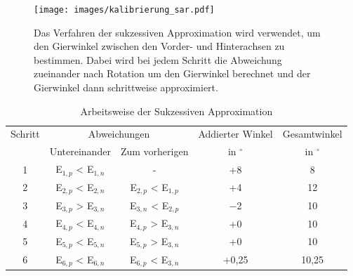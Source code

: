 	\begin{figure}[h]
		\centering
		\texttt{[image: images/kalibrierung\_sar.pdf]}
		\caption[Sukzessive Approximation]{Das Verfahren der sukzessiven Approximation wird verwendet, um den Gierwinkel zwischen den Vorder- und Hinterachsen zu bestimmen. Dabei wird bei jedem Schritt die Abweichung zueinander nach Rotation um den Gierwinkel berechnet und der Gierwinkel dann schrittweise approximiert.}
		\label{img:sar}
	\end{figure}


	\begin{table}[h!]
		\centering
		\caption{Arbeitsweise der Sukzessiven Approximation}
		\label{tab:sar}
		\begin{tabular}{ccccc}
			\toprule
			Schritt & \multicolumn{2}{c}{Abweichungen} & Addierter Winkel & Gesamtwinkel\\
			& Untereinander & Zum vorherigen & in $^\circ$& in $^\circ$\\
			\midrule
			1 & E$_{1,p}$ < E$_{1,n}$ 	& -	& +8  & 8 \\
			2 & E$_{2,p}$ < E$_{2,n}$ 	& E$_{2,p}$ < E$_{1,p}$	& +4 & 12\\
			3 & E$_{3,p}$ > E$_{3,n}$ 	& E$_{3,n}$ < E$_{2,p}$	& $-$2  & 10 \\
			4 & E$_{4,p}$ < E$_{4,n}$ 	& E$_{4,p}$ > E$_{3,n}$	& +0  & 10 \\
			5 & E$_{5,p}$ < E$_{5,n}$ 	& E$_{5,p}$ > E$_{3,n}$	& +0  & 10 \\
			6 & E$_{6,p}$ < E$_{6,n}$ 	& E$_{6,p}$ < E$_{3,n}$	& +0,25  & 10,25 \\
			\bottomrule
		\end{tabular}
	\end{table}